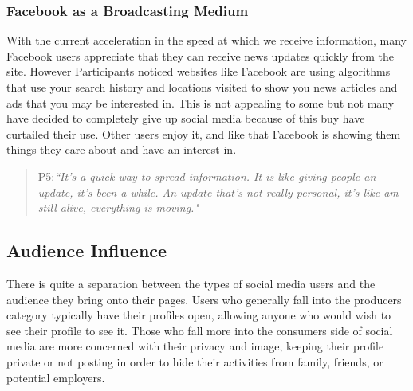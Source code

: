 \subsubsection{Facebook as a Broadcasting Medium}
With the current acceleration in the speed at which we receive information, many Facebook users appreciate that they can receive news updates quickly from the site. However Participants noticed websites like Facebook are using algorithms that use your search history and locations visited to show you news articles and ads that you may be interested in. This is not appealing to some but not many have decided to completely give up social media because of this buy have curtailed their use. Other users enjoy it, and like that Facebook is showing them things they care about and have an interest in.
\begin{quote}
P5:\textit{``It's a quick way to spread information. It is like giving people an update, it's been a while. An update that's not really personal, it's like am still alive, everything is moving."}
\end{quote}
\subsection{Audience Influence}
There is quite a separation between the types of social media users and the audience they bring onto their pages. Users who generally fall into the producers category typically have their profiles open, allowing anyone who would wish to see their profile to see it. Those who fall more into the consumers side of social media are more concerned with their privacy and image, keeping their profile private or not posting in order to hide their activities from family, friends, or potential employers.
